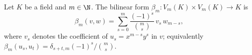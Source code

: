 Let $K$ be a field and $m\in\N$. The bilinear form $\beta_m\colon V_m(K)\times V_m(K)\to K$ is
\[
  \beta_m(v,w)=\sum_{s=0}^m\frac{(-1)^s}{\binom ms}\,v_s\,w_{m-s},
\]
where $v_s$ denotes the coefficient of $u_s=x^{m-s}y^s$ in $v$; equivalently $\beta_m(u_s,u_t)=\delta_{s+t,m}(-1)^s/\binom ms$.
